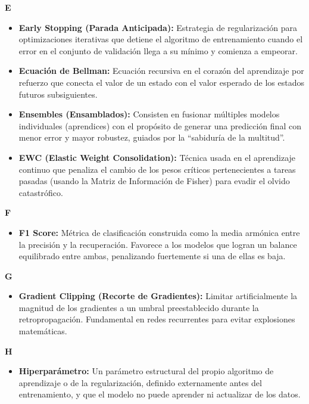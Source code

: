 \documentclass[12pt]{book} %
\providecommand{\tightlist}{%
  \setlength{\itemsep}{0pt}\setlength{\parskip}{0pt}}
\begin{document}
\textbf{E}

\begin{itemize}
\tightlist
\item
  \textbf{Early Stopping (Parada Anticipada):} Estrategia de
  regularización para optimizaciones iterativas que detiene el algoritmo
  de entrenamiento cuando el error en el conjunto de validación llega a
  su mínimo y comienza a empeorar.
\item
  \textbf{Ecuación de Bellman:} Ecuación recursiva en el corazón del
  aprendizaje por refuerzo que conecta el valor de un estado con el
  valor esperado de los estados futuros subsiguientes.
\item
  \textbf{Ensembles (Ensamblados):} Consisten en fusionar múltiples
  modelos individuales (aprendices) con el propósito de generar una
  predicción final con menor error y mayor robustez, guiados por la
  ``sabiduría de la multitud''.
\item
  \textbf{EWC (Elastic Weight Consolidation):} Técnica usada en el
  aprendizaje continuo que penaliza el cambio de los pesos críticos
  pertenecientes a tareas pasadas (usando la Matriz de Información de
  Fisher) para evadir el olvido catastrófico.
\end{itemize}

\textbf{F}

\begin{itemize}
\tightlist
\item
  \textbf{F1 Score:} Métrica de clasificación construida como la media
  armónica entre la precisión y la recuperación. Favorece a los modelos
  que logran un balance equilibrado entre ambas, penalizando fuertemente
  si una de ellas es baja.
\end{itemize}

\textbf{G}

\begin{itemize}
\tightlist
\item
  \textbf{Gradient Clipping (Recorte de Gradientes):} Limitar
  artificialmente la magnitud de los gradientes a un umbral
  preestablecido durante la retropropagación. Fundamental en redes
  recurrentes para evitar explosiones matemáticas.
\end{itemize}

\textbf{H}

\begin{itemize}
\tightlist
\item
  \textbf{Hiperparámetro:} Un parámetro estructural del propio algoritmo
  de aprendizaje o de la regularización, definido externamente antes del
  entrenamiento, y que el modelo no puede aprender ni actualizar de los
  datos.
\end{itemize}
\end{document}
